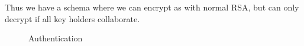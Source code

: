 Thus we have a schema where we can encrypt as with normal RSA, but can only decrypt if all key holders collaborate.

\begin{figure}
\begin{msc}{Authentication}

\setlength{\instdist}{2.5cm}
\setlength{\actionwidth}{3cm}

\nextlevel[2]
\nextlevel
{}
\nextlevel
{}
\nextlevel[4]
\nextlevel
{}
\nextlevel[4]
\nextlevel[4]
\nextlevel
{}
\nextlevel[4]
\end{msc}
\caption{}
\label{msc:adwda}
\end{figure}


